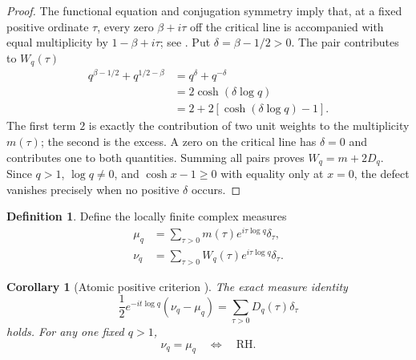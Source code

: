 \documentclass[11pt]{amsart}
\numberwithin{equation}{section}
\theoremstyle{plain}
\newtheorem{corollary}[theorem]{Corollary}
\theoremstyle{definition}
\newtheorem{definition}[theorem]{Definition}
\theoremstyle{remark}
\newcommand{\RH}{\mathrm{RH}}
\newcommand{\1}{\mathbf{1}}
\begin{document}
\begin{proof}
The functional equation and conjugation symmetry imply that, at a fixed
positive ordinate \(\tau\), every zero \(\beta+i\tau\) off the critical
line is accompanied with equal multiplicity by
\(1-\beta+i\tau\); see \cite[Chapter~2]{Titchmarsh1986}.  Put
\(\delta=\beta-1/2>0\).  The pair contributes to \(W_q(\tau)\)
\begin{align}
q^{\beta-1/2}+q^{1/2-\beta}
&=
q^\delta+q^{-\delta}
\label{eq:defect_pair_one}
\\
&=
2\cosh(\delta\log q)
\label{eq:defect_pair_two}
\\
&=
2+2\left[\cosh(\delta\log q)-1\right].
\label{eq:defect_pair_three}
\end{align}
The first term \(2\) is exactly the contribution of two unit weights to
the multiplicity \(m(\tau)\); the second is the excess.  A zero on the
critical line has \(\delta=0\) and contributes one to both quantities.
Summing all pairs proves \(W_q=m+2D_q\).  Since \(q>1\),
\(\log q\neq0\), and \(\cosh x-1\geq0\) with equality only at \(x=0\),
the defect vanishes precisely when no positive \(\delta\) occurs.
\end{proof}

\begin{definition}
\label{def:atomic_measures}
Define the locally finite complex measures
\begin{align}
\mu_q
&=
\sum_{\tau>0}
m(\tau)e^{i\tau\log q}\delta_\tau,
\label{eq:muq_measure}
\\
\nu_q
&=
\sum_{\tau>0}
W_q(\tau)e^{i\tau\log q}\delta_\tau.
\label{eq:nuq_measure}
\end{align}
\end{definition}


\begin{corollary}[Atomic positive criterion {}]
\label{cor:atomic_positive_criterion}
The exact measure identity
\begin{equation}
\boxed{
\frac12e^{-it\log q}(\nu_q-\mu_q)
=
\sum_{\tau>0}D_q(\tau)\delta_\tau
}
\label{eq:positive_measure_identity}
\end{equation}
holds.  For any one fixed \(q>1\),
\begin{equation}
\nu_q=\mu_q
\quad\Longleftrightarrow\quad
\RH.
\label{eq:measure_RH_equivalence}
\end{equation}
\end{corollary}
\end{document}

